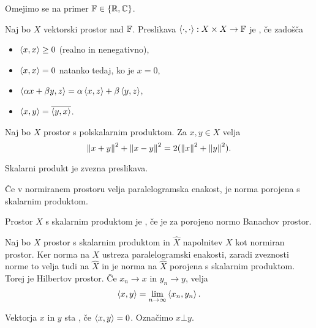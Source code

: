 
Omejimo se na primer $\mathbb{F} \in \{\mathbb{R}, \mathbb{C}\}$.

\begin{definicija}
  Naj bo $X$ vektorski prostor nad $\mathbb{F}$.
  Preslikava $\left< \cdot, \cdot \right> : X \times X \to \mathbb{F}$ je , če zadošča
  \begin{itemize}
  \item $\left< x,x \right> \ge 0$ (realno in nenegativno),
  \item $\left< x,x \right> = 0$ natanko tedaj, ko je $x = 0$,
  \item $\left< \alpha x + \beta y, z \right> = \alpha \left< x,z \right> + \beta \left< y,z \right>$,
  \item $\left< x,y \right> = \overline{\left< y,x \right>}$.
  \end{itemize}
\end{definicija}

\begin{trditev}
  Naj bo $X$ prostor s polskalarnim produktom.
  Za $x, y \in X$ velja
  \[
	\left\lVert x+y\right\rVert^2 + \left\lVert x-y\right\rVert^2 = 2 (\left\lVert x\right\rVert^2 + \left\lVert y\right\rVert^2).
  \]
\end{trditev}

\begin{trditev}
  Skalarni produkt je zvezna preslikava.
\end{trditev}

\begin{izrek}
  Če v normiranem prostoru velja paralelogramska enakost, je norma porojena s
  skalarnim produktom.
\end{izrek}

\begin{definicija}
  Prostor $X$ s skalarnim produktom je , če je za
  porojeno normo Banachov prostor.
\end{definicija}

Naj bo $X$ prostor s skalarnim produktom in $\hat{X}$ napolnitev $X$ kot
normiran prostor.
Ker norma na $X$ ustreza paralelogramski enakosti, zaradi zveznosti norme to
velja tudi na $\hat{X}$ in je norma na $\hat{X}$ porojena s skalarnim produktom.
Torej je Hilbertov prostor.
Če $x_n \to x$ in $y_n \to y$, velja
\[
  \left< x,y \right> = \lim_{n \to \infty} \left< x_n, y_n \right>.
\]

\begin{definicija}
  Vektorja $x$ in $y$ sta , če $\left< x,y \right> = 0$.
  Označimo $x \bot y$.
\end{definicija}

